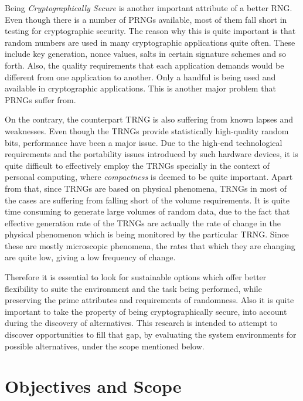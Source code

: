 Being \textit{Cryptographically Secure} is another important attribute of a better RNG. Even though there is a number of PRNGs available, most of them fall short in testing for cryptographic security. The reason why this is quite important is that random numbers are used in many cryptographic applications quite often. These include key generation, nonce values, salts in certain signature schemes and so forth. Also, the quality requirements that each application demands would be different from one application to another. Only a handful is being used and available in cryptographic applications. This is another major problem that PRNGs suffer from.

On the contrary, the counterpart TRNG is also suffering from known lapses and weaknesses. Even though the TRNGs provide statistically high-quality random bits, performance have been a major issue. Due to the high-end technological requirements and the portability issues introduced by such hardware devices, it is quite difficult to effectively employ the TRNGs specially in the context of personal computing, where \textit{compactness} is deemed to be quite important. Apart from that, since TRNGs are based on physical phenomena, TRNGs in most of the cases are suffering from falling short of the volume requirements. It is quite time consuming to generate large volumes of random data, due to the fact that effective generation rate of the TRNGs are actually the rate of change in the physical phenomenon which is being monitored by the particular TRNG. Since these are mostly microscopic phenomena, the rates that which they are changing are quite low, giving a low frequency of change.

Therefore it is essential to look for sustainable options which offer better flexibility to suite the environment and the task being performed, while preserving the prime attributes and requirements of randomness. Also it is quite important to take the property of being cryptographically secure, into account during the discovery of alternatives. This research is intended to attempt to discover opportunities to fill that gap, by evaluating the system environments for possible alternatives, under the scope mentioned below.

\section{Objectives and Scope}


